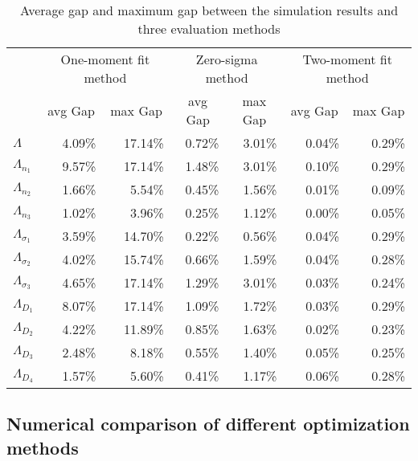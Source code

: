 \documentclass[preprint,12pt]{elsarticle}
\begin{document}
\begin{table}[htbp]
\small
  \centering
  \caption{Average gap and maximum gap between the simulation results and three evaluation methods}
    \begin{tabular}{lrrrrrr}
    \toprule
          & \multicolumn{2}{c}{One-moment fit method} & \multicolumn{2}{c}{Zero-sigma method} & \multicolumn{2}{c}{Two-moment fit method}  \\
          & \multicolumn{1}{c}{avg Gap} & \multicolumn{1}{c}{max Gap} & \multicolumn{1}{c}{avg Gap} & \multicolumn{1}{c}{max Gap} & \multicolumn{1}{c}{avg Gap} & \multicolumn{1}{c}{max Gap} \\
    \midrule
    $\Lambda$ & 4.09\% & 17.14\% & 0.72\% & 3.01\% & 0.04\% & 0.29\% \\
   $\Lambda_{n_{1}}$ & 9.57\% & 17.14\% & 1.48\% & 3.01\% & 0.10\% & 0.29\% \\
   $\Lambda_{n_{2}}$ & 1.66\% & 5.54\% & 0.45\% & 1.56\% & 0.01\% & 0.09\% \\
    $\Lambda_{n_{3}}$& 1.02\% & 3.96\% & 0.25\% & 1.12\% & 0.00\% & 0.05\% \\
      $\Lambda_{\sigma_{1}}$ & 3.59\% & 14.70\% & 0.22\% & 0.56\% & 0.04\% & 0.29\% \\
     $\Lambda_{\sigma_{2}}$ & 4.02\% & 15.74\% & 0.66\% & 1.59\% & 0.04\% & 0.28\% \\
    $\Lambda_{\sigma_{3}}$& 4.65\% & 17.14\% & 1.29\% & 3.01\% & 0.03\% & 0.24\% \\
        $\Lambda_{D_{1}}$ & 8.07\% & 17.14\% & 1.09\% & 1.72\% & 0.03\% & 0.29\% \\
        $\Lambda_{D_{2}}$ & 4.22\% & 11.89\% & 0.85\% & 1.63\% & 0.02\% & 0.23\% \\
        $\Lambda_{D_{3}}$ & 2.48\% & 8.18\% & 0.55\% & 1.40\% & 0.05\% & 0.25\% \\
        $\Lambda_{D_{4}}$ & 1.57\% & 5.60\% & 0.41\% & 1.17\% & 0.06\% & 0.28\% \\
    \bottomrule
    \end{tabular}%
  \label{tab:evaluationsummerylognormal}%
\end{table}%


\subsection{Numerical comparison of different optimization methods}
\end{document}
